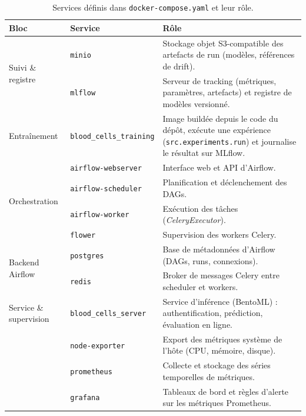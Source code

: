 \begin{table}[H]
  \centering
  \small
  \setlength{\tabcolsep}{4pt}
  \renewcommand{\arraystretch}{1.2}
  \begin{tabularx}{\linewidth}{@{}l l X@{}}
    \toprule
    \textbf{Bloc} & \textbf{Service} & \textbf{Rôle} \\
    \midrule
    \multirow{2}{*}{Suivi \& registre}
      & \texttt{minio}  & Stockage objet S3-compatible des artefacts de run (modèles, références de drift). \\
      & \texttt{mlflow} & Serveur de tracking (métriques, paramètres, artefacts) et registre de modèles versionné. \\
    \midrule
    Entraînement
      & \texttt{blood\_cells\_training} & Image buildée depuis le code du dépôt, exécute une expérience (\texttt{src.experiments.run}) et journalise le résultat sur MLflow. \\
    \midrule
    \multirow{4}{*}{Orchestration}
      & \texttt{airflow-webserver} & Interface web et API d'Airflow. \\
      & \texttt{airflow-scheduler} & Planification et déclenchement des DAGs. \\
      & \texttt{airflow-worker} & Exécution des tâches (\emph{CeleryExecutor}). \\
      & \texttt{flower} & Supervision des workers Celery. \\
    \midrule
    \multirow{2}{*}{Backend Airflow}
      & \texttt{postgres} & Base de métadonnées d'Airflow (DAGs, runs, connexions). \\
      & \texttt{redis}    & Broker de messages Celery entre scheduler et workers. \\
    \midrule
    Service \& supervision
      & \texttt{blood\_cells\_server} & Service d'inférence (BentoML) : authentification, prédiction, évaluation en ligne. \\
      & \texttt{node-exporter} & Export des métriques système de l'hôte (CPU, mémoire, disque). \\
      & \texttt{prometheus} & Collecte et stockage des séries temporelles de métriques. \\
      & \texttt{grafana} & Tableaux de bord et règles d'alerte sur les métriques Prometheus. \\
    \bottomrule
  \end{tabularx}
  \caption{Services définis dans \texttt{docker-compose.yaml} et leur rôle.}
  \label{tab:mlops-services}
\end{table}

